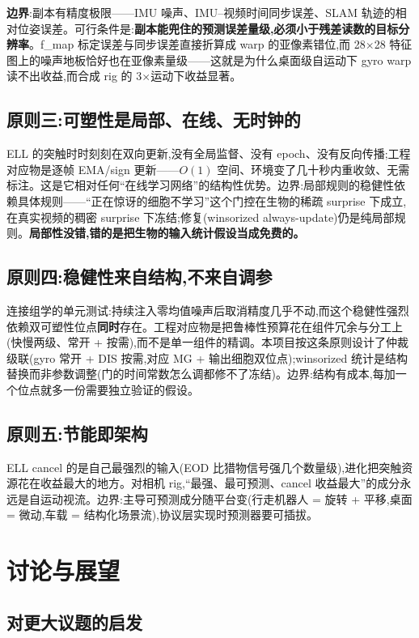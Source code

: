\documentclass[UTF8,12pt,a4paper]{ctexart}
\begin{document}
\textbf{边界}:副本有精度极限——IMU 噪声、IMU--视频时间同步误差、SLAM 轨迹的相对位姿误差。可行条件是:\textbf{副本能兜住的预测误差量级,必须小于残差读数的目标分辨率}。f\_map 标定误差与同步误差直接折算成 warp 的亚像素错位,而 28$\times$28 特征图上的噪声地板恰好也在亚像素量级——这就是为什么桌面级自运动下 gyro warp 读不出收益,而合成 rig 的 3$\times$运动下收益显著。

\subsection{原则三:可塑性是局部、在线、无时钟的}

ELL 的突触时时刻刻在双向更新,没有全局监督、没有 epoch、没有反向传播;工程对应物是逐帧 EMA/sign 更新——$O(1)$ 空间、环境变了几十秒内重收敛、无需标注。这是它相对任何``在线学习网络''的结构性优势。边界:局部规则的稳健性依赖具体规则——``正在惊讶的细胞不学习''这个门控在生物的稀疏 surprise 下成立,在真实视频的稠密 surprise 下冻结;修复(winsorized always-update)仍是纯局部规则。\textbf{局部性没错,错的是把生物的输入统计假设当成免费的。}

\subsection{原则四:稳健性来自结构,不来自调参}

连接组学的单元测试:持续注入零均值噪声后取消精度几乎不动,而这个稳健性强烈依赖双可塑性位点\textbf{同时}存在。工程对应物是把鲁棒性预算花在组件冗余与分工上(快慢两级、常开 + 按需),而不是单一组件的精调。本项目按这条原则设计了仲裁级联(gyro 常开 + DIS 按需,对应 MG + 输出细胞双位点);winsorized 统计是结构替换而非参数调整(门的时间常数怎么调都修不了冻结)。边界:结构有成本,每加一个位点就多一份需要独立验证的假设。

\subsection{原则五:节能即架构}

ELL cancel 的是自己最强烈的输入(EOD 比猎物信号强几个数量级),进化把突触资源花在收益最大的地方。对相机 rig,``最强、最可预测、cancel 收益最大''的成分永远是自运动视流。边界:主导可预测成分随平台变(行走机器人 = 旋转 + 平移,桌面 = 微动,车载 = 结构化场景流),协议层实现时预测器要可插拔。

\section{讨论与展望}

\subsection{对更大议题的启发}
\end{document}
